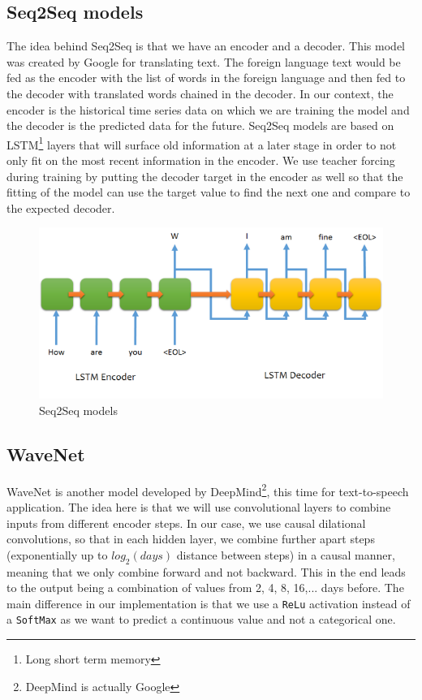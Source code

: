 \documentclass[11pt]{article}
\begin{document}
    \subsection{Seq2Seq models}
    The idea behind Seq2Seq is that we have an encoder and a decoder. This model was created by Google for translating text. The foreign language text would be fed as the encoder with the list of words in the foreign language and then fed to the decoder with translated words chained in the decoder. In our context, the encoder is the historical time series data on which we are training the model and the decoder is the predicted data for the future. Seq2Seq models are based on LSTM\footnote{Long short term memory} layers that will surface old information at a later stage in order to not only fit on the most recent information in the encoder. We use teacher forcing during training by putting the decoder target in the encoder as well so that the fitting of the model can use the target value to find the next one and compare to the expected decoder.
    \begin{figure}[H]
        \centering
        \includegraphics[width=.6\textwidth]{seq2seq.png}
        \caption{Seq2Seq models}
    \end{figure}
    \subsection{WaveNet}
    WaveNet is another model developed by DeepMind\footnote{DeepMind is actually Google}, this time for text-to-speech application. The idea here is that we will use convolutional layers to combine inputs from different encoder steps. In our case, we use causal dilational convolutions, so that in each hidden layer, we combine further apart steps (exponentially up to $log_2(days)$ distance between steps) in a causal manner, meaning that we only combine forward and not backward. This in the end leads to the output being a combination of values from 2, 4, 8, 16,... days before. The main difference in our implementation is that we use a \verb+ReLu+ activation instead of a \verb+SoftMax+ as we want to predict a continuous value and not a categorical one.\\
\end{document}
